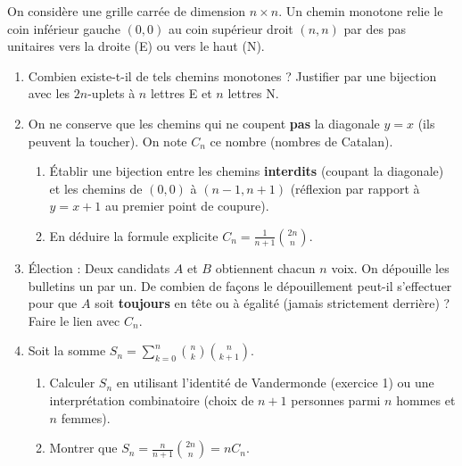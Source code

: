 \documentclass[11pt]{article}
\begin{document}
\begin{exercice}
On considère une grille carrée de dimension $n \times n$. Un chemin monotone relie le coin inférieur gauche $(0,0)$ au coin supérieur droit $(n,n)$ par des pas unitaires vers la droite (E) ou vers le haut (N).
\begin{enumerate}
    \item Combien existe-t-il de tels chemins monotones ? Justifier par une bijection avec les $2n$-uplets à $n$ lettres E et $n$ lettres N.
    \item On ne conserve que les chemins qui ne coupent \textbf{pas} la diagonale $y=x$ (ils peuvent la toucher). On note $C_n$ ce nombre (nombres de Catalan).
    \begin{enumerate}
        \item Établir une bijection entre les chemins \textbf{interdits} (coupant la diagonale) et les chemins de $(0,0)$ à $(n-1,n+1)$ (réflexion par rapport à $y=x+1$ au premier point de coupure).
        \item En déduire la formule explicite $C_n = \frac{1}{n+1}\binom{2n}{n}$.
    \end{enumerate}
    \item Élection : Deux candidats $A$ et $B$ obtiennent chacun $n$ voix. On dépouille les bulletins un par un. De combien de façons le dépouillement peut-il s'effectuer pour que $A$ soit \textbf{toujours} en tête ou à égalité (jamais strictement derrière) ? Faire le lien avec $C_n$.
    \item Soit la somme $S_n = \sum_{k=0}^{n} \binom{n}{k}\binom{n}{k+1}$. 
    \begin{enumerate}
        \item Calculer $S_n$ en utilisant l'identité de Vandermonde (exercice 1) ou une interprétation combinatoire (choix de $n+1$ personnes parmi $n$ hommes et $n$ femmes).
        \item Montrer que $S_n = \frac{n}{n+1}\binom{2n}{n} = n C_n$.
    \end{enumerate}
\end{enumerate}
\end{exercice}
\end{document}
